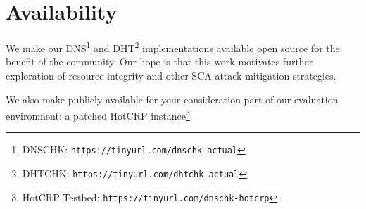 \section{Availability} \label{sec:availability}

We make our DNS\footnote{DNSCHK: \texttt{https://tinyurl.com/dnschk-actual}} and
DHT\footnote{DHTCHK: \texttt{https://tinyurl.com/dhtchk-actual}} \SYSTEM{}
implementations available open source for the benefit of the community. Our hope
is that this work motivates further exploration of resource integrity and other
SCA attack mitigation strategies.

We also make publicly available for your consideration part of our evaluation
environment: a patched HotCRP instance\footnote{HotCRP Testbed:
\texttt{https://tinyurl.com/dnschk-hotcrp}}.
